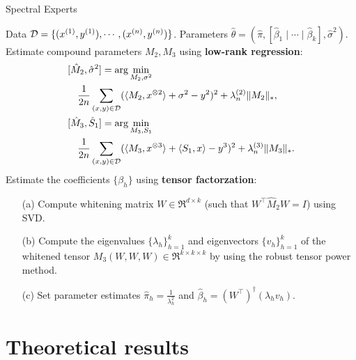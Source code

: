 \begin{algorithm}[t]
  \caption{Spectral Experts}
  \label{algo:spectral-experts}
  \begin{algorithmic}[1]
    \INPUT Data $\mathcal{D} = \{ (x^{(1)}, y^{(1)}), \cdots, (x^{(n)}, y^{(n)}) \}$.
    \OUTPUT Parameters $\hat\theta = (\hat \pi, [\hat \beta_1 \mid \cdots \mid \hat \beta_k], \hat\sigma^2)$.
    \STATE Estimate compound parameters $M_2, M_3$ using \textbf{low-rank regression}:
    \begin{align}
      &[\hat M_2, \hat \sigma^2] = \arg\min_{M_2,\sigma^2} \label{eqn:estimateM2} \\
      &\quad\frac{1}{2n} \sum_{(x,y) \in \mathcal{D}} (\langle M_2, x^{\otimes 2} \rangle + \sigma^2 - y^2)^2 + \lambda_n^{(2)} \|M_2\|_*, \nonumber \\
       &[\hat M_3, \hat S_1] = \arg\min_{M_3,S_1} \label{eqn:estimateM3} \\
       &\quad\frac{1}{2n} \sum_{(x,y) \in \mathcal{D}} (\langle M_3, x^{\otimes 3} \rangle + \langle S_1, x \rangle - y^3)^2 + \lambda_n^{(3)} \|M_3\|_*. \nonumber
    \end{align}
    \STATE Estimate the coefficients $\{\beta_h\}$ using \textbf{tensor factorzation}:
    \begin{enumerate}
      \item [(a)] Compute whitening matrix $W \in \Re^{d \times k}$ (such that $W^\top
      \hat M_2 W = I$) using SVD.
      \item [(b)] Compute the eigenvalues $\{\lambda_h\}_{h=1}^k$
      and eigenvectors $\{v_h\}_{h=1}^k$
      of the whitened tensor $M_3(W, W, W) \in \Re^{k \times k \times k}$
      by using the robust tensor power method.
    \item [(c)] Set parameter estimates $\hat\pi_h = \frac{1}{\lambda_h^2}$
    and $\hat\beta_h = (W^{\top})^\dagger (\lambda_h v_h)$.
    \end{enumerate}
  \end{algorithmic}
\end{algorithm}

\section{Theoretical results}

